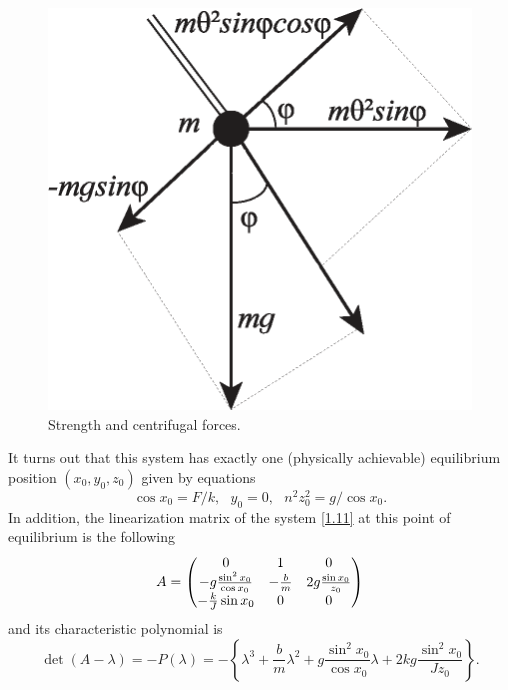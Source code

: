 \begin{example}
\begin{figure}[!ht]
	\centering
	\includegraphics [scale=1]{jtr16}
	\caption{Strength and centrifugal forces.}
	\label{fig:1.6}
\end{figure}

It turns out that this system has exactly one (physically achievable) equilibrium position $(x_{0},y_{0},z_{0})$ given by equations
\begin{equation}
\label{1.12}
\cos x_{0}=F/k,\text{ \ }y_{0}=0,\text{ \ }n^{2}z_{0}^{2}=g/\cos x_{0}.
\end{equation}
In addition, the linearization matrix of the system \eqref{1.11} at this point of equilibrium is the following
\begin{equation}
\label{1.13}
A=
\begin{pmatrix}
0 & 1 & 0 \\
-g\frac{\sin ^{2}x_{0}}{\cos x_{0}} & -\frac{b}{m} & 2g\frac{\sin x_{0}}{%
	z_{0}} \\
-\frac{k}{J}\sin x_{0} & 0 & 0%
\end{pmatrix}
\end{equation}
and its characteristic polynomial is
\begin{equation}
\label{1.14}
\det \left( A-\lambda \right) =-P(\lambda )=-\left\{ \lambda ^{3}+\frac{b}{m}%
\lambda ^{2}+g\frac{\sin ^{2}x_{0}}{\cos x_{0}}\lambda +2kg\frac{\sin
	^{2}x_{0}}{Jz_{0}}\right\} .
\end{equation}


\end{example}

